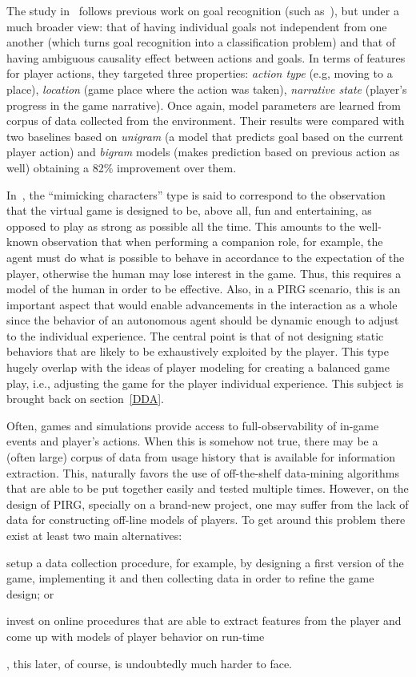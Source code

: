 The study in~\cite{ha_goal_2011} follows previous work on goal recognition (such as~\cite{mott_probabilistic_2006}), but under a much broader view: that of having individual goals not independent from one another (which turns goal recognition into a classification problem) and that of having ambiguous causality effect between actions and goals. In terms of features for player actions, they targeted three properties: \textit{action type} (e.g, moving to a place), \textit{location} (game place where the action was taken), \textit{narrative state} (player's progress in the game narrative).  Once again, model parameters are learned from corpus of data collected from the environment. Their results were compared with two baselines based on \textit{unigram} (a model that predicts goal based on the current player action) and \textit{bigram} models (makes prediction based on previous action as well) obtaining a 82\% improvement over them.

In~\cite{herik_opponent_2005}, the ``mimicking characters'' type is said to correspond to the observation that the virtual game is designed to be, above all, fun and entertaining, as opposed to play as strong as possible all the time. This amounts to the well-known observation that when performing a companion role, for example, the agent must do what is possible to behave in accordance to the expectation of the player, otherwise the human may lose interest in the game. Thus, this requires a model of the human in order to be effective. Also, in a PIRG scenario, this is an important aspect that would enable advancements in the interaction as a whole since the behavior of an autonomous agent should be dynamic enough to adjust to the individual experience. The central point is that of not designing static behaviors that are likely to be exhaustively exploited by the player. This type hugely overlap with the ideas of player modeling for creating a balanced game play, i.e., adjusting the game for the player individual experience. This subject is brought back on section~\ref{DDA}.  

Often, games and simulations provide access to full-observability of in-game events and player's actions. When this is somehow not true, there may be a (often large) corpus of data from usage history that is available for information extraction. This, naturally favors the use of off-the-shelf data-mining algorithms that are able to be put together easily and tested multiple times. However, on the design of PIRG, specially on a brand-new project, one may suffer from the lack of data for constructing off-line models of players. To get around this problem there exist at least two main alternatives: \begin{inparaenum}\item setup a data collection procedure, for example, by designing a first version of the game, implementing it and then collecting data in order to refine the game design; or \item invest on online procedures that are able to extract features from the player and come up with models of player behavior on run-time\end{inparaenum}, this later, of course, is undoubtedly much harder to face.

